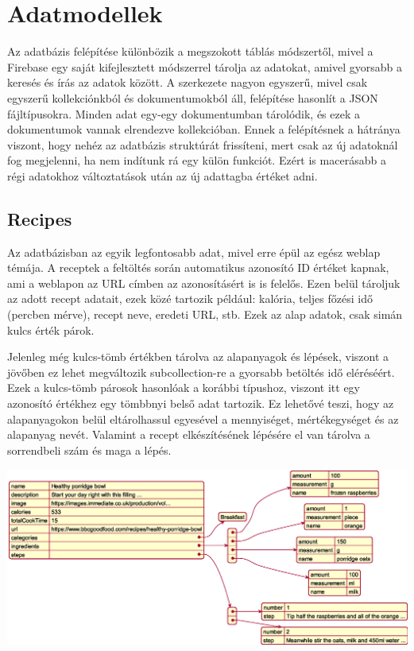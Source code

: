 \documentclass[12pt]{report}
\theoremstyle{definition}
\begin{document}
\chapter{Adatmodellek}
Az adatbázis felépítése különbözik a megszokott táblás módszertől, mivel a Firebase egy saját kifejlesztett módszerrel tárolja az adatokat, amivel gyorsabb a keresés és írás az adatok között. A szerkezete nagyon egyszerű, mivel csak egyszerű kollekciónkból és dokumentumokból áll, felépítése hasonlít a JSON fájltípusokra. Minden adat egy-egy dokumentumban tárolódik, és ezek a dokumentumok vannak elrendezve kollekcióban. Ennek a felépítésnek a hátránya viszont, hogy nehéz az adatbázis struktúrát frissíteni, mert csak az új adatoknál fog megjelenni, ha nem indítunk rá egy külön funkciót. Ezért is macerásabb a régi adatokhoz változtatások után az új adattagba értéket adni. 

\section{Recipes}
Az adatbázisban az egyik legfontosabb adat, mivel erre épül az egész weblap témája. A receptek a feltöltés során automatikus azonosító ID értéket kapnak, ami a weblapon az URL címben az azonosításért is is felelős. Ezen belül tároljuk az adott recept adatait, ezek közé tartozik például: kalória, teljes főzési idő (percben mérve), recept neve, eredeti URL, stb. Ezek az alap adatok, csak simán kulcs érték párok. 

Jelenleg még kulcs-tömb értékben tárolva az alapanyagok és lépések, viszont a jövőben ez lehet megváltozik subcollection-re a gyorsabb betöltés idő eléréséért. Ezek a kulcs-tömb párosok hasonlóak a korábbi típushoz, viszont itt egy azonosító értékhez egy tömbbnyi belső adat tartozik. Ez lehetővé teszi, hogy az alapanyagokon belül eltárolhassul egyesével a mennyiséget, mértékegységet és az alapanyag nevét. Valamint a recept elkészítésének lépésére el van tárolva a sorrendbeli szám és maga a lépés.

\noindent
\includegraphics[width=\textwidth]{out/diagrams/jsonRecipes/jsonRecipes.eps}
\end{document}
